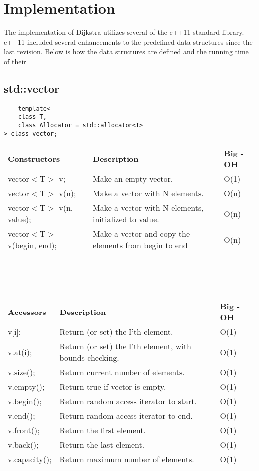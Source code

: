 \documentclass[12pt]{article}
\begin{document}
\section[Implementation]{Implementation}
The implementation of Dijkstra utilizes several of the c++11 standard library. c++11
included several enhancements to the predefined data structures since the last revision. Below is how the
 data structures are defined and the running time of their 
\subsection{std::vector}
\begin{lstlisting}
	template<
    class T,
    class Allocator = std::allocator<T>
> class vector;
\end{lstlisting}
\begin{tabular}{ l l l }
\textbf{Constructors} & \textbf{Description} & \textbf{Big - OH}\\
vector$<$T$>$ v; & Make an empty vector. & O(1)\\
vector$<$T$>$ v(n); & Make a vector with N elements. & O(n)\\
vector$<$T$>$ v(n, value); & Make a vector with N elements, initialized to value. & O(n)\\
vector$<$T$>$ v(begin, end); & Make a vector and copy the elements from begin to end & O(n)\\
\end{tabular}
\\
\\
\\
\begin{tabular}{ l l l }
\textbf{Accessors} & \textbf{Description} & \textbf{Big - OH}\\
v[i]; & Return (or set) the I'th element. & O(1)\\
v.at(i); & Return (or set) the I'th element, with bounds checking. & O(1)\\
v.size(); & Return current number of elements. & O(1)\\
v.empty(); & Return true if vector is empty. & O(1)\\
v.begin(); & Return random access iterator to start. & O(1)\\
v.end(); & Return random access iterator to end. & O(1)\\
v.front(); & Return the first element. & O(1)\\
v.back(); & Return the last element. & O(1)\\
v.capacity(); & Return maximum number of elements. & O(1)\\
\end{tabular}
\end{document}
